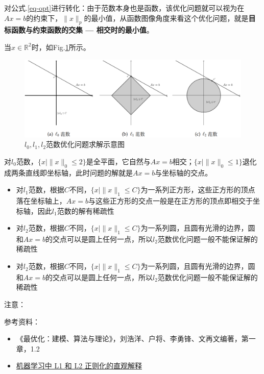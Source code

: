 对公式.\ref{eq-opt}进行转化：由于范数本身也是函数，该优化问题就可以视为在$A x = b$的约束下，$\|x\|_p$的最小值，从函数图像角度来看这个优化问题，就是\textbf{目标函数与约束函数的交集 --- 相交时的最小值}。

当$x \in \mathbb{R}^2$时，如Fig.\ref{fig:norm optimize}所示。
\begin{figure}[h]
	\centering
	\includegraphics[width=.85\textwidth]{pics/norm optimize.png}
	\caption{$l_0, l_1, l_2$范数优化问题求解示意图}
	\label{fig:norm optimize}
\end{figure}
对$l_0$范数，$\{x | \|x\|_0 \leq 2\}$是全平面，它自然与$A x = b$相交；$\{x | \|x\|_0 \leq 1\}$退化成两条直线即坐标轴，此时问题的解就是$A x = b$与坐标轴的交点。
\begin{itemize}
	\item 对$l_1$范数，根据$C$不同，$\{x | \|x\|_1 \leq C\}$为一系列正方形，这些正方形的顶点落在坐标轴上，$A x = b$与这些正方形的交点一般是在正方形的顶点即相交于坐标轴，因此$l_1$范数的解有稀疏性
	\item 对$l_2$范数，根据$C$不同，$\{x | \|x\|_1 \leq C\}$为一系列圆，且圆有光滑的边界，圆和$A x = b$的交点可以是圆上任何一点，所以$l_2$范数优化问题一般不能保证解的稀疏性
	\item 对$l_2$范数，根据$C$不同，$\{x | \|x\|_1 \leq C\}$为一系列圆，且圆有光滑的边界，圆和$A x = b$的交点可以是圆上任何一点，所以$l_2$范数优化问题一般不能保证解的稀疏性
\end{itemize}

注意：

参考资料：
\begin{itemize}
	\item《最优化：建模、算法与理论》，刘浩洋、户将、李勇锋、文再文编著，第一章，1.2
	\item \href{https://blog.csdn.net/red_stone1/article/details/80755144}{机器学习中 L1 和 L2 正则化的直观解释}
\end{itemize}


